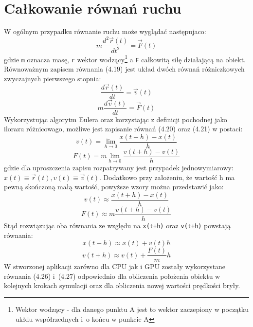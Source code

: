 \section{Całkowanie równań ruchu}
W ogólnym przypadku równanie ruchu może wyglądać następujaco:
\begin{equation}m\frac{d^2\vec r(t)}{dt^2}=\vec F(t)\end{equation} gdzie \verb$m$ oznacza masę, \verb$r$ wektor wodzący\footnote{Wektor wodzący - dla danego punktu A jest to wektor zaczepiony w początku ukłdu współrzednych i~o końcu w punkcie A\cite{wiki4}} a \verb$F$ całkowitą siłę działającą na obiekt. Równoważnym zapisem równania (4.19) jest układ dwóch równań różniczkowych zwyczajnych pierwszego stopnia:
\begin{equation}\frac{d\vec r(t)}{dt}=\vec v(t)\end{equation}
\begin{equation}m\frac{d\vec v(t)}{dt}=\vec F(t)\end{equation}
Wykorzystując algorytm Eulera oraz korzystając z definicji pochodnej jako ilorazu różnicowago, możliwe jest zapisanie równań (4.20) oraz (4.21) w postaci:
\begin{equation}v(t)=\lim_{h \to 0}\frac{x(t+h) - x(t)}{h}\end{equation}
\begin{equation}F(t)=m\lim_{h \to 0}\frac{v(t+h) - v(t)}{h}\end{equation}
gdzie dla uproszczenia zapisu rozpatrywany jest przypadek jednowymiarowy: $x(t) \equiv \vec r(t),$\newline$v(t) \equiv \vec v(t)$. Dodatkowo przy założeniu, że wartość h ma pewną skończoną małą wartość, powyższe wzory można przedstawić jako:
\begin{equation}v(t)\approx\frac{x(t+h) - x(t)}{h}\end{equation}
\begin{equation}F(t)\approx m\frac{v(t+h) - v(t)}{h}\end{equation}
Stąd rozwiązując oba równania ze względu na \verb$x(t+h)$ oraz \verb$v(t+h)$ powstają równania:
\begin{equation}x(t+h)\approx x(t)+v(t)h\end{equation}
\begin{equation}v(t+h)\approx v(t)+\frac{F(t)}{m}h\end{equation}
W stworzonej aplikacji zarówno dla CPU jak i GPU zostały wykorzystane równania (4.26) i~(4.27) odpowiednio dla obliczenia położenia obiektu w kolejnych krokach symulacji oraz dla obliczenia nowej wartości prędkości bryły.\\
